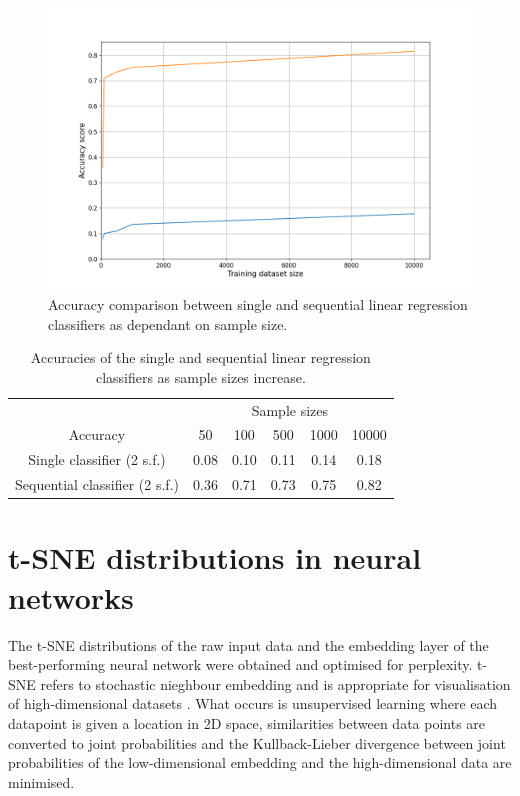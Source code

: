 \documentclass[11pt,a4paper]{article}
\begin{document}
\begin{figure}[htb]
    \centering
    \includegraphics[width=\columnwidth, keepaspectratio]{../classifier_compare.png}
    \caption{Accuracy comparison between single and sequential linear regression classifiers as dependant on sample size.}\label{fig:class_compare}
\end{figure}

\begin{table}[ht]
    \centering
    \begin{tabular}{c|c|c|c|c|c}
        & \multicolumn{5}{c}{Sample sizes} \\
        \cline{2-6}
        Accuracy& 50 & 100 & 500 & 1000 & 10000\\
        \hline
        Single classifier (2 s.f.)& 0.08 & 0.10 & 0.11 &0.14 &0.18\\
        Sequential classifier (2 s.f.)& 0.36 & 0.71 &0.73 &0.75& 0.82\\
    \end{tabular}
    \caption{Accuracies of the single and sequential linear regression classifiers as sample sizes increase.}\label{tab:lin_metric}
\end{table}
\clearpage
\section{t-SNE distributions in neural networks}
The t-SNE distributions of the raw input data and the embedding layer of the best-performing neural network were obtained and optimised for perplexity. t-SNE refers to stochastic nieghbour embedding and is appropriate for visualisation of high-dimensional datasets \citep{JMLR:v9:vandermaaten08a}. What occurs is unsupervised learning where each datapoint is given a location in 2D space, similarities between data points are converted to joint probabilities and the Kullback-Lieber divergence between joint probabilities of the low-dimensional embedding and the high-dimensional data are minimised.
\end{document}
